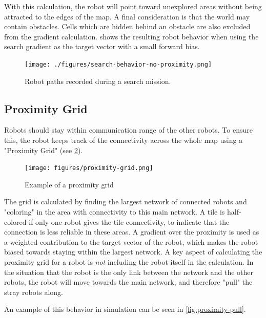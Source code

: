 With this calculation, the robot will point toward unexplored areas without being attracted to the edges of the map. A final consideration is that the world may contain obstacles. Cells which are hidden behind an obstacle are also excluded from the gradient calculation.  shows the resulting robot behavior when using the search gradient as the target vector with a small forward bias.

\begin{figure}[h]
    \begin{center}
        \texttt{[image: ./figures/search-behavior-no-proximity.png]}
    \end{center}
    \caption{Robot paths recorded during a search mission.}
    \label{fig:search-no-proximity}
\end{figure}

\subsection{Proximity Grid}
Robots should stay within communication range of the other robots. To ensure this, the robot keeps track of the connectivity {\color{red} across} the whole map using a "Proximity Grid" (see \cref{fig:proximity-grid}). \\
\begin{figure}[h]
    \begin{center}
        \texttt{[image: figures/proximity-grid.png]}
    \end{center}
    \caption{Example of a proximity grid}\label{fig:proximity-grid}
\end{figure}

The grid is calculated by finding the largest network of connected robots and "coloring" in the area with connectivity to this main network. A tile is half-colored if only one robot gives the tile connectivity, to indicate that the connection is less reliable in these areas. A {\color{red} gradient} over the proximity is used as a weighted contribution to the target vector of the robot, which makes the robot biased towards staying within the largest network. A key aspect of calculating the proximity grid for a robot is \emph{not} including the robot itself in the calculation. In the situation that the robot is the only link between the network and the other robots, the robot will move towards the main network, and therefore "pull" the stray robots along. 

An example of this behavior in simulation can be seen in \cref{fig:proximity-pull}.

